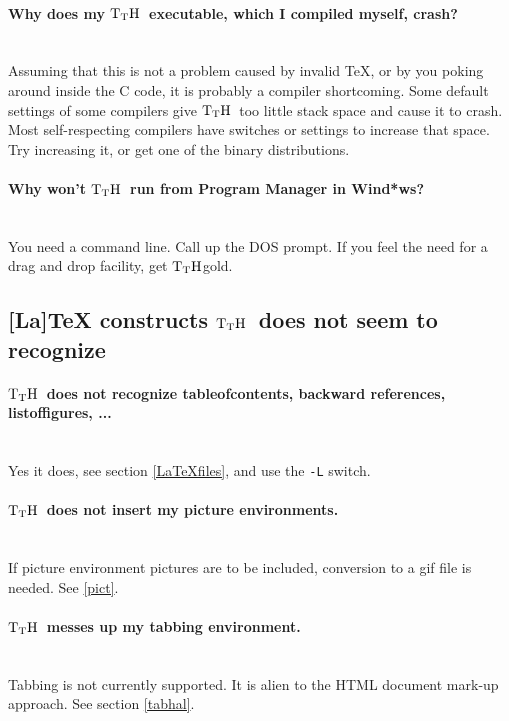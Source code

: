 \documentclass[12pt]{article}
\def\TtH{$\rm{}T_TH$}
\def\TtHgold{\TtH{}gold}
\begin{document}
\paragraph{Why does my \TtH\ executable, which I compiled myself, crash?}
\leavevmode\\ Assuming that this is not a problem caused by invalid
\TeX, or by you poking around inside the C code, it is probably a
compiler shortcoming.  Some default settings of some compilers give
\TtH\ too little stack space and cause it to crash. Most
self-respecting compilers have switches or settings to increase that
space. Try increasing it, or get one of the binary distributions.

\paragraph{Why won't \TtH\ run from Program Manager in Wind*ws?}\leavevmode\\
You need a command line. Call up the DOS prompt. If you feel the need
for a drag and drop facility, get \TtHgold.


\subsection{[La]TeX constructs \TtH\ does not seem to recognize}

\paragraph{\TtH\ does not recognize tableofcontents, backward
references, listoffigures, ...}\leavevmode\\
Yes it does, see section \ref{LaTeXfiles}, and use the \verb+-L+ switch.

\paragraph{\TtH\ does not insert my picture environments.}\leavevmode\\
If picture environment pictures are to be included, conversion to a gif file
is needed. See \ref{pict}.

\paragraph{\TtH\ messes up my tabbing environment.}\leavevmode\\
Tabbing is not currently supported. It is alien to the HTML document
mark-up approach. See section \ref{tabhal}.
\end{document}
